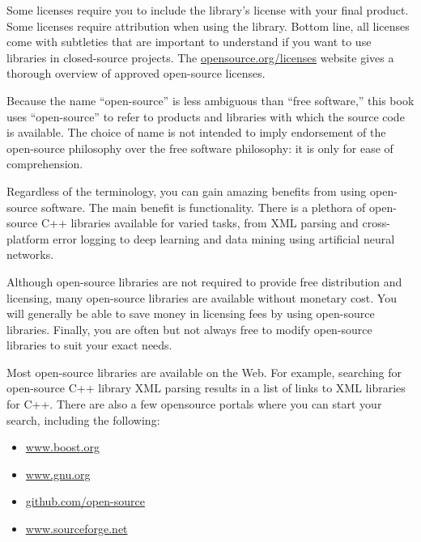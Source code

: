 Some licenses require you to include the library’s license with your final product. Some licenses require attribution when using the library. Bottom line, all licenses come with subtleties that are important to understand if you want to use libraries in closed-source projects. The \url{opensource.org/licenses} website gives a thorough overview of approved open-source licenses.

Because the name “open-source” is less ambiguous than “free software,” this book uses “open-source” to refer to products and libraries with which the source code is available. The choice of name is not intended to imply endorsement of the open-source philosophy over the free software philosophy: it is only for ease of comprehension.


Regardless of the terminology, you can gain amazing benefits from using open-source software. The main benefit is functionality. There is a plethora of open-source C++ libraries available for varied tasks, from XML parsing and cross-platform error logging to deep learning and data mining using artificial neural networks.

Although open-source libraries are not required to provide free distribution and licensing, many open-source libraries are available without monetary cost. You will generally be able to save money in licensing fees by using open-source libraries.
Finally, you are often but not always free to modify open-source libraries to suit your exact needs.

Most open-source libraries are available on the Web. For example, searching for open-source C++ library XML parsing results in a list of links to XML libraries for C++. There are also a few opensource portals where you can start your search, including the following:

\begin{itemize}
\item
\url{www.boost.org}

\item
\url{www.gnu.org}

\item
\url{github.com/open-source}

\item
\url{www.sourceforge.net}
\end{itemize}


